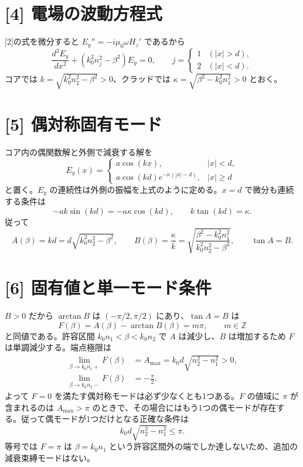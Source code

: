 \documentclass[11pt,a4paper]{article}
\begin{document}
\section*{[4] 電場の波動方程式}
[2]の式を微分すると $E_y''=-i\mu_0\omega H_z'$ であるから
\begin{equation}
  \boxed{\frac{d^2E_y}{dx^2}+
  (k_0^2n_j^2-\beta^2)E_y=0,\qquad
  j=\begin{cases}1&(|x|>d),\\2&(|x|<d).\end{cases}}
\end{equation}
コアでは $k=\sqrt{k_0^2n_2^2-\beta^2}>0$、クラッドでは $\kappa=\sqrt{\beta^2-k_0^2n_1^2}>0$ とおく。

\section*{[5] 偶対称固有モード}
コア内の偶関数解と外側で減衰する解を
\begin{equation}
 E_y(x)=\begin{cases}
  a\cos(kx),& |x|<d,\\
  a\cos(kd)e^{-\kappa(|x|-d)},& |x|\ge d
 \end{cases}
\end{equation}
と置く。$E_y$ の連続性は外側の振幅を上式のように定める。$x=d$ で微分も連続する条件は
\begin{equation}
  -ak\sin(kd)=-a\kappa\cos(kd),\qquad
  k\tan(kd)=\kappa.
\end{equation}
従って
\begin{equation}
  \boxed{A(\beta)=kd=d\sqrt{k_0^2n_2^2-\beta^2},\qquad
  B(\beta)=\frac{\kappa}{k}
  =\sqrt{\frac{\beta^2-k_0^2n_1^2}{k_0^2n_2^2-\beta^2}},\qquad
  \tan A=B.}
\end{equation}

\section*{[6] 固有値と単一モード条件}
$B>0$ だから $\arctan B$ は $(-\pi/2,\pi/2)$ にあり、$\tan A=B$ は
\begin{equation}
  F(\beta)=A(\beta)-\arctan B(\beta)=m\pi,
  \qquad m\in\mathbb Z
\end{equation}
と同値である。許容区間 $k_0n_1<\beta<k_0n_2$ で $A$ は減少し、$B$ は増加するため $F$ は単調減少する。端点極限は
\begin{align}
  \lim_{\beta\to k_0n_1+}F(\beta)&=A_{\max}
    =k_0d\sqrt{n_2^2-n_1^2}>0,\\
  \lim_{\beta\to k_0n_2-}F(\beta)&=-\frac{\pi}{2}.
\end{align}
よって $F=0$ を満たす偶対称モードは必ず少なくとも1つある。$F$ の値域に $\pi$ が含まれるのは $A_{\max}>\pi$ のときで、その場合にはもう1つの偶モードが存在する。従って偶モードが1つだけとなる正確な条件は
\begin{equation}
  \boxed{k_0d\sqrt{n_2^2-n_1^2}\le\pi.}
\end{equation}
等号では $F=\pi$ は $\beta=k_0n_1$ という許容区間外の端でしか達しないため、追加の減衰束縛モードはない。
\end{document}
